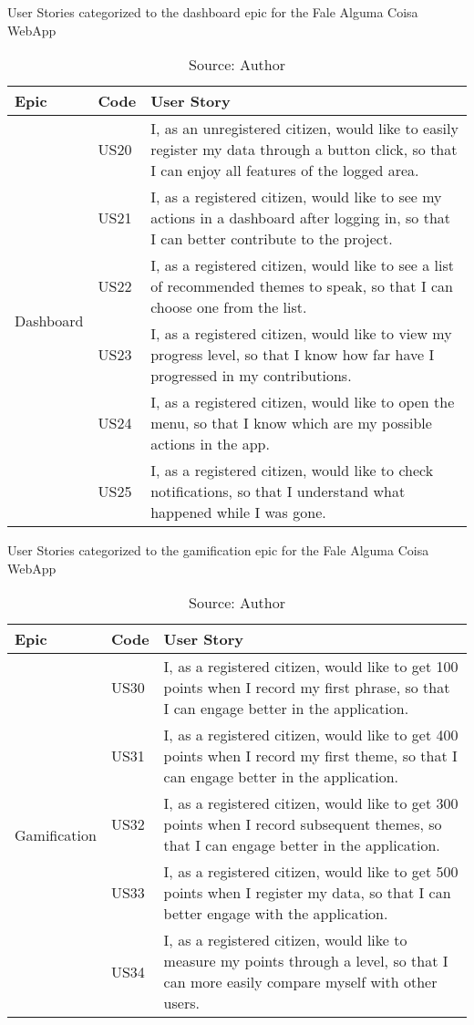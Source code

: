 \begin{table}[h]
\caption{User Stories categorized to the dashboard epic for the Fale Alguma Coisa WebApp}
\label{tab:falealgumacoisa-dashboard-epic}
\centering
\begin{tabular}{|p{2cm}|p{1cm}|p{10cm}|}
\hline
Epic & Code & User Story \\ \hline
\multirow{6}{*}{Dashboard} 
    & US20 & I, as an unregistered citizen, would like to easily register my data through a button click, so that I can enjoy all features of the logged area. \\ \cline{2-3} 
    & US21 & I, as a registered citizen, would like to see my actions in a dashboard after logging in, so that I can better contribute to the project. \\ \cline{2-3} 
    & US22 & I, as a registered citizen, would like to see a list of recommended themes to speak, so that I can choose one from the list. \\ \cline{2-3} 
    & US23 & I, as a registered citizen, would like to view my progress level, so that I know how far have I progressed in my contributions. \\ \cline{2-3} 
    & US24 & I, as a registered citizen, would like to open the menu, so that I know which are my possible actions in the app. \\ \cline{2-3} 
    & US25 & I, as a registered citizen, would like to check notifications, so that I understand what happened while I was gone. \\ \hline
\end{tabular}
\caption*{Source: Author}
\end{table}

\begin{table}[h]
\caption{User Stories categorized to the gamification epic for the Fale Alguma Coisa WebApp}
\label{tab:falealgumacoisa-gamification-epic}
\centering
\begin{tabular}{|p{2.5cm}|p{1cm}|p{10cm}|}
\hline
Epic & Code & User Story \\ \hline
\multirow{6}{*}{Gamification}
    & US30 & I, as a registered citizen, would like to get 100 points when I record my first phrase, so that I can engage better in the application. \\ \cline{2-3} 
    & US31 & I, as a registered citizen, would like to get 400 points when I record my first theme, so that I can engage better in the application. \\ \cline{2-3} 
    & US32 & I, as a registered citizen, would like to get 300 points when I record subsequent themes, so that I can engage better in the application. \\ \cline{2-3} 
    & US33 & I, as a registered citizen, would like to get 500 points when I register my data, so that I can better engage with the application. \\ \cline{2-3} 
    & US34 & I, as a registered citizen, would like to measure my points through a level, so that I can more easily compare myself with other users. \\ \hline
\end{tabular}
\caption*{Source: Author}
\end{table}

